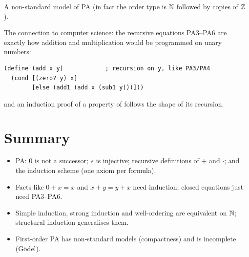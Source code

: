 \begin{center}

\small A non-standard model of PA (in fact the order type is $\mathbb{N}$ followed by copies of $\mathbb{Z}$).
\end{center}

\begin{aside}
The connection to computer science: the recursive equations PA3--PA6 are exactly how
addition and multiplication would be programmed on unary numbers:
\begin{lstlisting}[style=racket]
(define (add x y)            ; recursion on y, like PA3/PA4
  (cond [(zero? y) x]
        [else (add1 (add x (sub1 y)))]))
\end{lstlisting}
and an induction proof of a property of  follows the shape of its recursion.
\end{aside}

\section*{Summary}
\begin{itemize}
  \item PA: $0$ is not a successor; $s$ is injective; recursive definitions of $+$ and
        $\cdot$; and the induction scheme (one axiom per formula).
  \item Facts like $0+x=x$ and $x+y=y+x$ need induction; closed equations just need
        PA3--PA6.
  \item Simple induction, strong induction and well-ordering are equivalent on $\mathbb{N}$;
        structural induction generalises them.
  \item First-order PA has non-standard models (compactness) and is incomplete (G\"odel).
\end{itemize}
